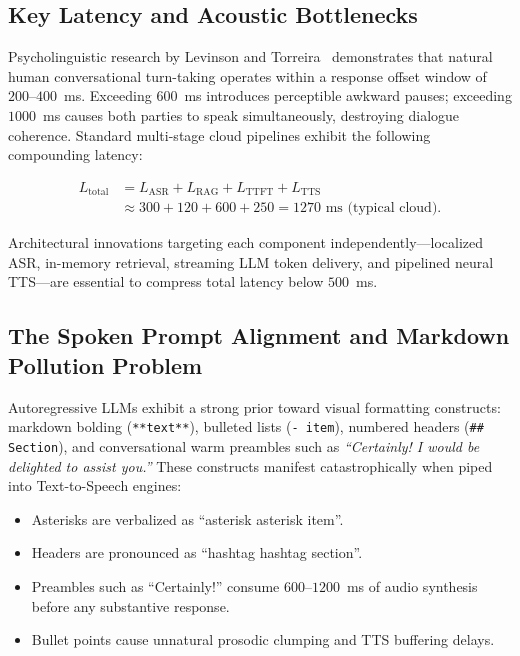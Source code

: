 \documentclass[11pt,a4paper]{article}
\begin{document}
\subsection{Key Latency and Acoustic Bottlenecks}
\label{subsec:latency_bottlenecks}

Psycholinguistic research by Levinson and Torreira~\cite{levinson2015timing} demonstrates that natural human conversational turn-taking operates within a response offset window of $200$--$400$~ms. Exceeding $600$~ms introduces perceptible awkward pauses; exceeding $1000$~ms causes both parties to speak simultaneously, destroying dialogue coherence. Standard multi-stage cloud pipelines exhibit the following compounding latency:

\begin{align}
L_{\text{total}} &= L_{\text{ASR}} + L_{\text{RAG}} + L_{\text{TTFT}} + L_{\text{TTS}} \nonumber \\
                 &\approx 300 + 120 + 600 + 250 = 1270\text{ ms (typical cloud)}.
\end{align}

Architectural innovations targeting each component independently---localized ASR, in-memory retrieval, streaming LLM token delivery, and pipelined neural TTS---are essential to compress total latency below $500$~ms.

\subsection{The Spoken Prompt Alignment and Markdown Pollution Problem}
\label{subsec:prompt_alignment}

Autoregressive LLMs exhibit a strong prior toward visual formatting constructs: markdown bolding (\texttt{**text**}), bulleted lists (\texttt{- item}), numbered headers (\texttt{\#\# Section}), and conversational warm preambles such as \textit{``Certainly! I would be delighted to assist you.''} These constructs manifest catastrophically when piped into Text-to-Speech engines:

\begin{itemize}[leftmargin=*]
    \item Asterisks are verbalized as ``asterisk asterisk item''.
    \item Headers are pronounced as ``hashtag hashtag section''.
    \item Preambles such as ``Certainly!'' consume $600$--$1200$~ms of audio synthesis before any substantive response.
    \item Bullet points cause unnatural prosodic clumping and TTS buffering delays.
\end{itemize}
\end{document}

